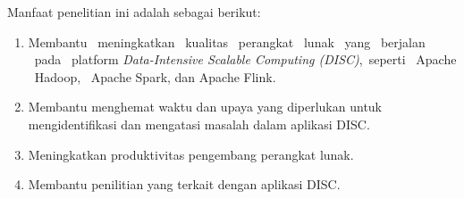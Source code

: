 Manfaat penelitian ini adalah sebagai berikut:

\begin{enumerate}[nolistsep]
  \item Membantu \ meningkatkan \ kualitas \  perangkat \  lunak \ yang \  berjalan \ pada \ platform \emph{Data-Intensive Scalable Computing (DISC)},\  seperti \ Apache \ Hadoop, \ Apache Spark, dan Apache Flink.
  \item Membantu menghemat waktu dan upaya yang diperlukan untuk mengidentifikasi dan mengatasi masalah dalam aplikasi DISC.
  \item Meningkatkan produktivitas pengembang perangkat lunak.
  \item Membantu penilitian yang terkait dengan aplikasi DISC.

\end{enumerate}
